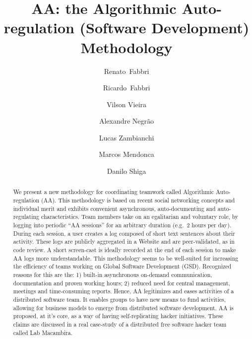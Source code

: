 \title{
    AA: the Algorithmic Auto-regulation (Software Development) Methodology
}

\author{%
Renato~Fabbri \and Ricardo~Fabbri \and Vilson Vieira \and Alexandre Negr\~{a}o \and Lucas Zambianchi
\and Marcos Mendonca \and Danilo Shiga
}

\maketitle

\begin{abstract}
We present a new methodology for coordinating teamwork called Algorithmic
Auto-regulation (AA). This methodology is based on recent social networking
concepts and individual merit and exhibits convenient asynchronous,
auto-documenting and auto-regulating characteristics. Team members take on an
egalitarian and voluntary role, by logging into periodic ``AA sessions'' for an
arbitrary duration (e.g.\ 2 hours per day).  During each session, a user creates
a log composed of short text sentences about their activity. These logs are
publicly aggregated in a Website and are peer-validated, as in code review. A
short screen-cast is ideally recorded at the end of each session to make AA logs
more understandable. This methodology seems to be well-suited for increasing the
efficiency of teams working on Global Software Development (GSD). Recognized
reasons for this are the: 1) built-in asynchronous on-demand communication,
documentation and proven working hours; 2) reduced need for central management,
meetings and time-consuming reports. Hence, AA legitimizes and eases activities
of a distributed software team.  It enables groups to have new means to fund
activities, allowing for business models to emerge from distributed software
development. AA is proposed, at it's core, as a way of having self-replicating
hacker initiatives. These claims are discussed in a real case-study of a
distributed free software hacker team called Lab Macambira.
\end{abstract}

